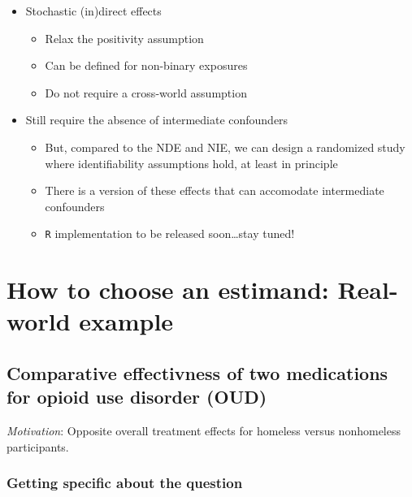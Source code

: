 \documentclass[
  12pt,
]{book}
\newcommand{\passthrough}[1]{#1}
\providecommand{\tightlist}{%
  \setlength{\itemsep}{0pt}\setlength{\parskip}{0pt}}
\theoremstyle{definition}
\theoremstyle{definition}
\theoremstyle{definition}
\newcommand{\1}{\mathbbm{1}}
\begin{document}
\begin{itemize}
\tightlist
\item
  Stochastic (in)direct effects

  \begin{itemize}
  \tightlist
  \item
    Relax the positivity assumption
  \item
    Can be defined for non-binary exposures
  \item
    Do not require a cross-world assumption
  \end{itemize}
\item
  Still require the absence of intermediate confounders

  \begin{itemize}
  \tightlist
  \item
    But, compared to the NDE and NIE, we can design a randomized study where
    identifiability assumptions hold, at least in principle
  \item
    There is a version of these effects that can accomodate intermediate
    confounders \citep{hejazi2020nonparametric}
  \item
    \passthrough{\lstinline!R!} implementation to be released soon\ldots stay tuned!
  \end{itemize}
\end{itemize}

\hypertarget{estimandirl}{%
\chapter{How to choose an estimand: Real-world example}\label{estimandirl}}

\hypertarget{comparative-effectivness-of-two-medications-for-opioid-use-disorder-oud}{%
\section{Comparative effectivness of two medications for opioid use disorder (OUD)}\label{comparative-effectivness-of-two-medications-for-opioid-use-disorder-oud}}

\emph{Motivation}: Opposite overall treatment effects for homeless versus
nonhomeless participants.

\hypertarget{getting-specific-about-the-question}{%
\subsection{Getting specific about the question}\label{getting-specific-about-the-question}}
\end{document}
